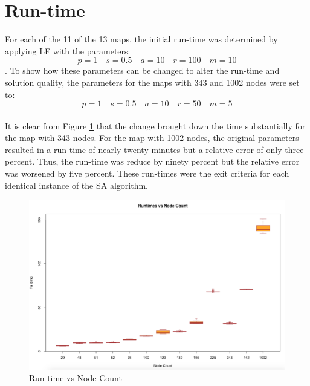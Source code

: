 \documentclass[12pt,letterpaper,oneside]{book}
\begin{document}
\section{Run-time}
For each of the 11 of the 13 maps, the initial run-time was determined by applying LF with the parameters:
\[p=1\quad s=0.5\quad a=10\quad r=100\quad m=10\]. To show how these parameters can be changed to alter the run-time and solution quality, the parameters for the maps with 343 and 1002 nodes were set to: 
\[p=1\quad s=0.5\quad a=10\quad r=50\quad m=5\]\\
It is clear from Figure \ref{rt} that the change brought down the time substantially for the map with 343 nodes. For the map with 1002 nodes, the original parameters resulted in a run-time of nearly twenty minutes but a relative error of only three percent. Thus, the run-time was reduce by ninety percent but the relative error was worsened by five percent. These run-times were the exit criteria for each identical instance of the SA algorithm.
\begin{figure}[H]
	\centering
	\includegraphics[width=1\linewidth]{rt.png}
	\caption{Run-time vs Node Count}
	\label{rt}
\end{figure}
\end{document}

